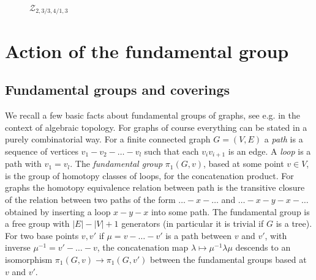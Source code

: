 \documentclass[11pt,a4paper]{amsart}
\theoremstyle{contraction}
\begin{document}
\begin{figure}
\caption{${\mathcal Z}_{2,3/3,4/1,3}$}
\label{fig:Z13}
\end{figure}


\section{Action of the fundamental group}\label{sec:lifting}
\subsection{Fundamental groups and coverings}
We recall a few basic facts about fundamental groups of graphs, see e.g. \cite{Sp} in the context of algebraic topology. For graphs of course everything can be stated in a purely combinatorial way.
For a finite connected graph $G=(V,E)$ a {\sl path} is a sequence of vertices $v_1-v_2-\ldots-v_l$ such that each $v_iv_{i+1}$ is an edge. A {\sl loop} is a path with $v_1=v_l$. The {\sl fundamental group} $\pi_1(G,v)$, based at some point $v\in V$, is the group of homotopy classes of loops, for the concatenation product. For graphs the homotopy equivalence relation between path is the transitive closure of the relation between two paths of the form
$\ldots -x-\ldots$ and $\ldots -x-y-x-\ldots$ obtained by inserting a loop $x-y-x$ into some path.
The fundamental group  is a free group with $|E|-|V|+1$ generators (in particular it is trivial if $G$ is a tree). For two base points $v,v'$ if $\mu=v-\ldots-v'$ is a path between $v$ and $v'$, with inverse $\mu^{-1}=v'-\ldots -v$, the concatenation map
$\lambda\mapsto \mu^{-1}\lambda\mu$ descends to an isomorphism 
$\pi_1(G,v)\to\pi_1(G,v')$ between the fundamental groups based at $v$ and $v'$.
\end{document}
